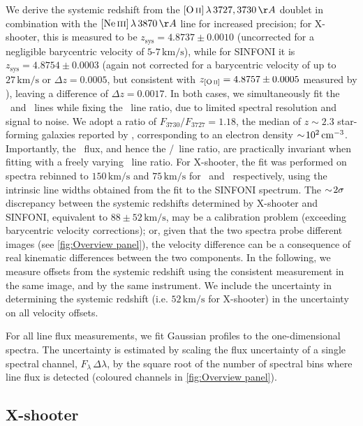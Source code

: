 We derive the systemic redshift from the $\OII \, \lambda \, 3727, 3730 \, \Angstrom$ doublet in combination with the $\NeIII \, \lambda \, 3870 \, \Angstrom$ line for increased precision; for X-shooter, this is measured to be $z_\text{sys} = 4.8737 \pm 0.0010$ (uncorrected for a negligible barycentric velocity of $5$-$7 \, \mathrm{km/s}$), while for SINFONI it is $z_\text{sys} = 4.8754 \pm 0.0003$ (again not corrected for a barycentric velocity of up to $27 \, \mathrm{km/s}$ or $\Delta z = 0.0005$, but consistent with $z_\OII = 4.8757 \pm 0.0005$ measured by \citealt{2007MNRAS.376..479S}), leaving a difference of $\Delta z = 0.0017$. In both cases, we simultaneously fit the \OII\ and \NeIII\ lines while fixing the \OII\ line ratio, due to limited spectral resolution and signal to noise. We adopt a ratio of $F_{3730}/F_{3727} = 1.18$, the median of $z \sim 2.3$ star-forming galaxies reported by \citet{2016ApJ...816...23S}, corresponding to an electron density $\sim \! 10^2 \, \mathrm{cm^{-3}}$. Importantly, the \OII\ flux, and hence the \NeIII/\OII\ line ratio, are practically invariant when fitting with a freely varying \OII\ line ratio. For X-shooter, the fit was performed on spectra rebinned to $150 \, \mathrm{km/s}$ and $75 \, \mathrm{km/s}$ for \OII\ and \NeIII\ respectively, using the intrinsic line widths obtained from the fit to the SINFONI spectrum. The $\sim \! 2 \sigma$ discrepancy between the systemic redshifts determined by X-shooter and SINFONI, equivalent to $88 \pm 52 \, \mathrm{km/s}$, may be a calibration problem (exceeding barycentric velocity corrections); or, given that the two spectra probe different images (see \cref{fig:Overview panel}), the velocity difference can be a consequence of real kinematic differences between the two components. In the following, we measure offsets from the systemic redshift using the consistent measurement in the same image, and by the same instrument. We include the uncertainty in determining the systemic redshift (i.e. $52 \, \mathrm{km/s}$ for X-shooter) in the uncertainty on all velocity offsets.

For all line flux measurements, we fit Gaussian profiles to the one-dimensional spectra. The uncertainty is estimated by scaling the flux uncertainty of a single spectral channel, $F_\lambda \, \Delta \lambda$, by the square root of the number of spectral bins where line flux is detected (coloured channels in \cref{fig:Overview panel}).

\subsection{X-shooter}
\label{ssec:Results: X-shooter}

